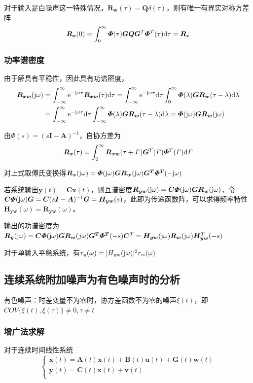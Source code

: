 \documentclass[11pt,a4paper]{ctexart}
\renewcommand{\d}{{\rm d}}
\newcommand{\e}{{\rm e}}
\renewcommand{\j}{{\rm j}}
\begin{document}
            对于输入是白噪声这一特殊情况，$\bm{R_w}(\tau)=\bm Q\delta(\tau)$，则有唯一有界实对称方差阵
            \[
            \bm{R_x}(0)=\int_0^\infty\bm\varPhi(\tau)\bm{GQG}^T\bm\varPhi^T(\tau)\d\tau=\bm R_x
            \]
        \subsubsection{功率谱密度}
            由于解具有平稳性，因此具有功谱密度，
            \begin{align*}
            \bm{R_{xw}}(\j\omega)&=\int_{-\infty}^\infty\e^{-\j\omega\tau}\bm{R_{xw}}(\tau)\d\tau=\int_{-\infty}^\infty\e^{-\j\omega\tau}\d\tau\int_0^\infty\bm\varPhi(\lambda)\bm{GR_w}(\tau-\lambda)\d\lambda\\
            &=\int_{-\infty}^\infty\e^{-\j\omega\tau}\d\tau\int_{-\infty}^\infty\bm\varPhi(\lambda)\bm{GR_w}(\tau-\lambda)\d\lambda=\bm\varPhi(\j\omega)\bm{GR_w}(\j\omega)
            \end{align*}

            由$\bm\varPhi(s)=(s\bm I-\bm A)^{-1}$，自协方差为
            \[
            \bm{R_x}(\tau)=\int_0^\infty\bm{R_{xw}}(\tau+\varGamma)\bm G^T(\varGamma)\bm\varPhi^T(\varGamma)\d\varGamma
            \]

            对上式取傅氏变换得$\bm{R_x}(\j\omega)=\bm{\varPhi}(\j\omega)\bm{GR_w}(\j\omega)\bm{G^T\varPhi^T}(-\j\omega)$

            若系统输出$\bm{y}(t)=\bm{Cx}(t)$，则互谱密度$\bm{R_{yw}}(\j\omega)=\bm{C\varPhi}(\j\omega)\bm{GR_w}(\j\omega)$，令$\bm{C\varPhi}(\j\omega)\bm{G}=\bm C(s\bm I-\bm A)^{-1}\bm G=\bm{H_{yw}}(s)$，此即为传递函数阵，可以求得频率特性$\bm{H_{yw}}(\omega)=\bm{R_{yw}}(\omega)$。

            输出的功谱密度为$\bm{R_y}(\j\omega)=\bm{C\varPhi}(\j\omega)\bm{GR_w}(j\omega)\bm{G^T\varPhi^T}(-s)\bm C^T=\bm{H_{yw}}(\j\omega)\bm{R_w}(\j\omega)\bm{H_{yw}}^T(-s)$

            对于单输入平稳系统，有$r_y(\omega)=|H_{yw}(\j\omega)|^2r_w(\omega)$
    \subsection{连续系统附加噪声为有色噪声时的分析}
        有色噪声：时差变量不为零时，协方差函数不为零的噪声$\xi(t)$，即$COV\{\xi(t),\xi(\tau)\}\neq0,\tau\neq t$
        \subsubsection{增广法求解}
            对于连续时间线性系统
            \[\begin{cases}
            \bm{\dot x}(t)=\bm{A}(t)\bm{x}(t)+\bm{B}(t)\bm{u}(t)+\bm{G}(t)\bm{w}(t)\\
            \bm{y}(t)=\bm{C}(t)\bm{x}(t)+\bm{v}(t)\\
            \end{cases}\]
\end{document}
